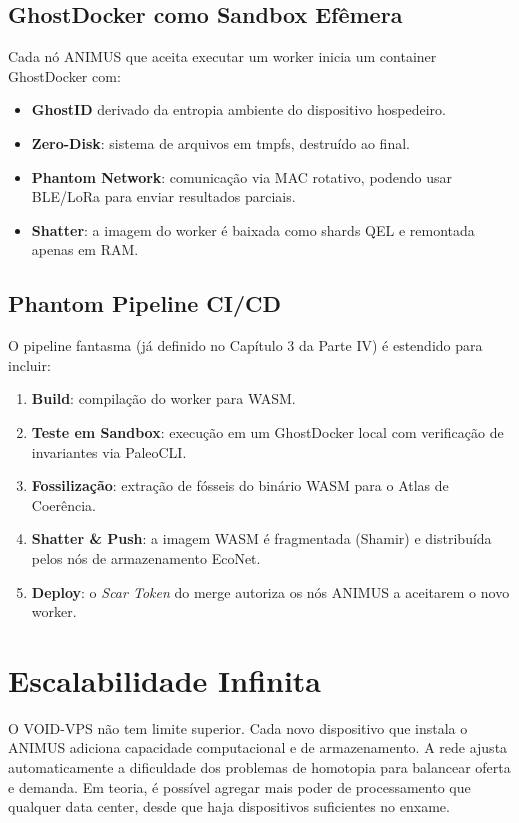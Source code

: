 \documentclass[12pt,a4paper,twoside]{book}
\theoremstyle{remark}
\begin{document}
\subsection{GhostDocker como Sandbox Ef\^emera}

Cada n\'o ANIMUS que aceita executar um worker inicia um container GhostDocker com:
\begin{itemize}
    \item \textbf{GhostID} derivado da entropia ambiente do dispositivo hospedeiro.
    \item \textbf{Zero-Disk}: sistema de arquivos em tmpfs, destru\'ido ao final.
    \item \textbf{Phantom Network}: comunica\c{c}\~{a}o via MAC rotativo, podendo usar BLE/LoRa para enviar resultados parciais.
    \item \textbf{Shatter}: a imagem do worker \'e baixada como shards QEL e remontada apenas em RAM.
\end{itemize}

\subsection{Phantom Pipeline CI/CD}

O pipeline fantasma (j\'a definido no Cap\'itulo 3 da Parte IV) \'e estendido para incluir:
\begin{enumerate}
    \item \textbf{Build}: compila\c{c}\~{a}o do worker para WASM.
    \item \textbf{Teste em Sandbox}: execu\c{c}\~{a}o em um GhostDocker local com verifica\c{c}\~{a}o de invariantes via PaleoCLI.
    \item \textbf{Fossiliza\c{c}\~{a}o}: extra\c{c}\~{a}o de f\'osseis do bin\'ario WASM para o Atlas de Coer\^encia.
    \item \textbf{Shatter \& Push}: a imagem WASM \'e fragmentada (Shamir) e distribu\'ida pelos n\'os de armazenamento EcoNet.
    \item \textbf{Deploy}: o \textit{Scar Token} do merge autoriza os n\'os ANIMUS a aceitarem o novo worker.
\end{enumerate}

\section{Escalabilidade Infinita}

O VOID-VPS n\~{a}o tem limite superior. Cada novo dispositivo que instala o ANIMUS adiciona capacidade computacional e de armazenamento. A rede ajusta automaticamente a dificuldade dos problemas de homotopia para balancear oferta e demanda. Em teoria, \'e poss\'ivel agregar mais poder de processamento que qualquer data center, desde que haja dispositivos suficientes no enxame.
\end{document}
